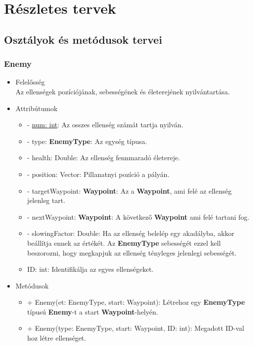 %
\chapter{Részletes tervek}

\thispagestyle{fancy}

\section{Osztályok és metódusok tervei}

\subsection{Enemy}
\begin{itemize}
\item Felelősség\\
Az ellenségek pozíciójának, sebességének és életerejének nyilvántartása.
\item Attribútumok
	\begin{itemize}
		\item - \underline{num: int}: Az osszes ellenség számát tartja nyilván.
		\item - type: \textbf{EnemyType}: Az egység típusa.
		\item - health: Double: Az ellenség fennmaradó életereje.
		\item - position: Vector: Pillanatnyi pozíció a pályán.
		\item - targetWaypoint: \textbf{Waypoint}: Az a \textbf{Waypoint}, ami felé az ellenség jelenleg tart.
		\item - nextWaypoint: \textbf{Waypoint}: A következő \textbf{Waypoint} ami felé tartani fog.
		\item - slowingFactor: Double: Ha az ellenség belelép egy akadályba, akkor beállítja ennek az értékét. Az \textbf{EnemyType} sebességét ezzel kell beszorozni, hogy megkapjuk az ellenség tényleges jelenlegi sebességét.
		\item ID: int: Identifikálja az egyes ellenségeket.
	\end{itemize}
\item Metódusok
	\begin{itemize}
		\item + Enemy(et: EnemyType, start: Waypoint): Létrehoz egy \textbf{EnemyType} típusú \textbf{Enemy}-t a start \textbf{Waypoint}-helyén.
		\item + Enemy(type: EnemyType, start: Waypoint, ID: int): Megadott ID-val hoz létre ellenséget.

\end{itemize}
\end{itemize}
